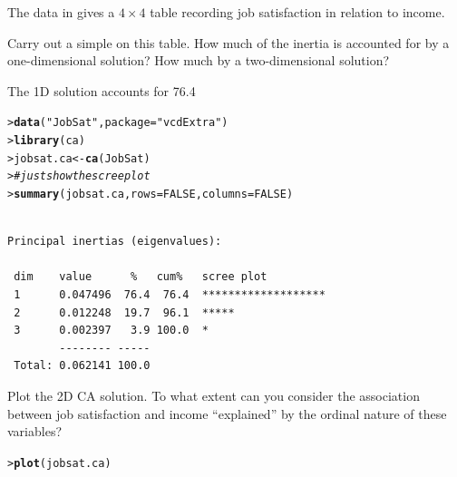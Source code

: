 \documentclass[10pt]{report}\usepackage[]{graphicx}\usepackage[]{color}
\makeatletter
\newcommand{\hlnum}[1]{\textcolor[rgb]{0.686,0.059,0.569}{#1}}%
\newcommand{\hlstr}[1]{\textcolor[rgb]{0.192,0.494,0.8}{#1}}%
\newcommand{\hlcom}[1]{\textcolor[rgb]{0.678,0.584,0.686}{\textit{#1}}}%
\newcommand{\hlstd}[1]{\textcolor[rgb]{0.345,0.345,0.345}{#1}}%
\newcommand{\hlkwb}[1]{\textcolor[rgb]{0.69,0.353,0.396}{#1}}%
\newcommand{\hlkwc}[1]{\textcolor[rgb]{0.333,0.667,0.333}{#1}}%
\newcommand{\hlkwd}[1]{\textcolor[rgb]{0.737,0.353,0.396}{\textbf{#1}}}%
\newenvironment{kframe}{%
 \def\at@end@of@kframe{}%
 \ifinner\ifhmode%
  \def\at@end@of@kframe{\end{minipage}}%
  \begin{minipage}{\columnwidth}%
 \fi\fi%
 \def\FrameCommand##1{\hskip\@totalleftmargin \hskip-\fboxsep
 \colorbox{shadecolor}{##1}\hskip-\fboxsep
     \hskip-\linewidth \hskip-\@totalleftmargin \hskip\columnwidth}%
 \MakeFramed {\advance\hsize-\width
   \@totalleftmargin\z@ \linewidth\hsize
   \@setminipage}}%
 {\par\unskip\endMakeFramed%
 \at@end@of@kframe}
\newenvironment{knitrout}{}{} %
\renewenvironment{knitrout}{\small\renewcommand{\baselinestretch}{.85}}{} %
\makeatother
\begin{document}
\begin{Exercises}

  \exercise The  data in  gives a $4 \times 4$ table recording job satisfaction
  in relation to income.
  \begin{enumerate*}
    \item  Carry out a simple \ca on this table.  How much of the inertia is accounted for by a
    one-dimensional solution?  How much by a two-dimensional solution?
    \begin{ans}
The 1D solution accounts for 76.4%
\begin{knitrout}\footnotesize
{}\color{fgcolor}\begin{kframe}
\begin{alltt}
\hlstd{> }\hlkwd{data}\hlstd{(}\hlstr{"JobSat"}\hlstd{,} \hlkwc{package}\hlstd{=}\hlstr{"vcdExtra"}\hlstd{)}
\hlstd{> }\hlkwd{library}\hlstd{(ca)}
\hlstd{> }\hlstd{jobsat.ca} \hlkwb{<-} \hlkwd{ca}\hlstd{(JobSat)}
\hlstd{> }    \hlcom{# just show the scree plot}
\hlstd{> }\hlkwd{summary}\hlstd{(jobsat.ca,} \hlkwc{rows}\hlstd{=}\hlnum{FALSE}\hlstd{,} \hlkwc{columns}\hlstd{=}\hlnum{FALSE}\hlstd{)}
\end{alltt}
\begin{verbatim}

Principal inertias (eigenvalues):

 dim    value      %   cum%   scree plot               
 1      0.047496  76.4  76.4  *******************      
 2      0.012248  19.7  96.1  *****                    
 3      0.002397   3.9 100.0  *                        
        -------- -----                                 
 Total: 0.062141 100.0                                 
\end{verbatim}
\end{kframe}
\end{knitrout}
    \end{ans}
    
    \item Plot the 2D CA solution.  To what extent can you consider the association between
    job satisfaction and income ``explained'' by the ordinal nature of these variables?
    \begin{ans}
\begin{knitrout}\footnotesize
{}\color{fgcolor}\begin{kframe}
\begin{alltt}
\hlstd{> }\hlkwd{plot}\hlstd{(jobsat.ca)}
\end{alltt}
\end{kframe}


\end{knitrout}
\end{ans}
\end{enumerate*}
\end{Exercises}
\end{document}
